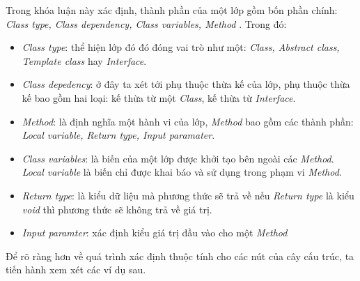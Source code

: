 \documentclass[12pt]{report}
\begin{document}
\noindent Trong khóa luận này xác định, thành phần của một lớp gồm bốn phần chính: \textit{Class type, Class dependency, Class variables, Method }. Trong đó:
\vspace{-0.1cm}
\begin{itemize}
	\item \textit{Class type}: thể hiện lớp đó đó đóng vai trò như một:\textit{ Class, Abstract class, Template class} hay \textit{Interface}.
	\item \textit{Class depedency}: ở đây  ta xét tới phụ thuộc thừa kế của lớp, phụ thuộc thừa kế bao gồm hai loại: kế thừa từ một \textit{Class}, kế thừa từ \textit{Interface}.
	\item \textit{Method}: là định nghĩa một hành vi của lớp, \textit{Method} bao gồm các thành phần: \textit{Local variable, Return type, Input paramater}.
	\item  \textit{Class variables}: là biến của một lớp được khởi tạo bên ngoài các \textit{Method}. \textit{Local variable} là biến chỉ được khai báo và sử dụng trong phạm vi \textit{Method}.  
	\item \textit{Return type}: là kiểu dữ liệu mà phương thức sẽ trả về nếu \textit{Return type} là kiểu \textit{void} thì phương thức sẽ không trả về giá trị.
	\item \textit{Input paramter}: xác định kiểu giá trị đầu vào cho một \textit{Method}
\end{itemize}
Để rõ ràng hơn về quá trình xác định thuộc tính cho các nút của cây cấu trúc, ta tiến hành xem xét các ví dụ sau.
\end{document}
